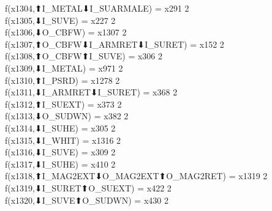 f(x1304,⬆I_METAL⬇I_SUARMALE) = x291 {2} \\
f(x1305,⬇I_SUVE) = x227 {2} \\
f(x1306,⬇O_CBFW) = x1307 {2} \\
f(x1307,⬆O_CBFW⬇I_ARMRET⬇I_SURET) = x152 {2} \\
f(x1308,⬆O_CBFW⬆I_SUVE) = x306 {2} \\
f(x1309,⬇I_METAL) = x971 {2} \\
f(x1310,⬆I_PSRD) = x1278 {2} \\
f(x1311,⬇I_ARMRET⬇I_SURET) = x368 {2} \\
f(x1312,⬆I_SUEXT) = x373 {2} \\
f(x1313,⬇O_SUDWN) = x382 {2} \\
f(x1314,⬇I_SUHE) = x305 {2} \\
f(x1315,⬇I_WHIT) = x1316 {2} \\
f(x1316,⬇I_SUVE) = x309 {2} \\
f(x1317,⬇I_SUHE) = x410 {2} \\
f(x1318,⬆I_MAG2EXT⬇O_MAG2EXT⬆O_MAG2RET) = x1319 {2} \\
f(x1319,⬇I_SURET⬆O_SUEXT) = x422 {2} \\
f(x1320,⬇I_SUVE⬆O_SUDWN) = x430 {2} \\
